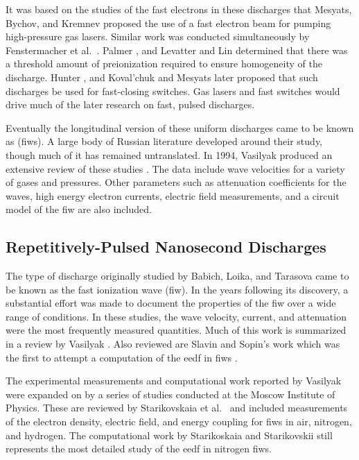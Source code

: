 It was based on the studies of the fast electrons in these discharges that
Mesyats, Bychov, and Kremnev proposed the use of a fast electron beam for
pumping high-pressure gas lasers. Similar work was conducted simultaneously by
Fenstermacher et al.~\cite{Fenstermacher1972}. Palmer \cite{Palmer1974}, and
Levatter and Lin \cite{Levatter1980} determined that there was a threshold
amount of preionization required to ensure homogeneity of the discharge. Hunter
\cite{Hunter1976}, and Koval'chuk and Mesyats \cite{Koval'chuk1976} later
proposed that such discharges be used for fast-closing switches. Gas lasers
\cite{Liu1973, Liberman1974, Pack1977, Kushner1983, Shimada1985} and fast
switches would drive much of the later research on fast, pulsed discharges.

Eventually the longitudinal version of these uniform discharges came to be known
as (\acs{fiw}s). A large body of Russian literature developed around their
study, though much of it has remained untranslated. In 1994, Vasilyak produced
an extensive review of these studies \cite{Vasilyak1994}. The data include wave
velocities for a variety of gases and pressures. Other parameters such as
attenuation coefficients for the waves, high energy electron currents, electric
field measurements, and a circuit model of the \acs{fiw} are also included.

\subsection{Repetitively-Pulsed Nanosecond Discharges}

The type of discharge originally studied by Babich, Loika, and Tarasova came to
be known as the fast ionization wave (\acs{fiw}). In the years following its
discovery, a substantial effort was made to document the properties of the
\acs{fiw} over a wide range of conditions. In these studies, the wave velocity,
current, and attenuation were the most frequently measured quantities. Much of
this work is summarized in a review by Vasilyak \cite{Vasilyak1994}. Also
reviewed are Slavin and Sopin's work which was the first to attempt a
computation of the \acs{eedf} in \acs{fiw}s \cite{Slavin1992}.

The experimental measurements and computational work reported by Vasilyak were
expanded on by a series of studies conducted at the Moscow Institute of Physics.
These are reviewed by Starikovskaia et al.~\cite{Starikovskaia2001} and included
measurements of the electron density, electric field, and energy coupling for
\acs{fiw}s in air, nitrogen, and hydrogen. The computational work by
Starikoskaia and Starikovskii \cite{Starikovskaia2001a} still represents the
most detailed study of the \acs{eedf} in nitrogen \acs{fiw}s.

